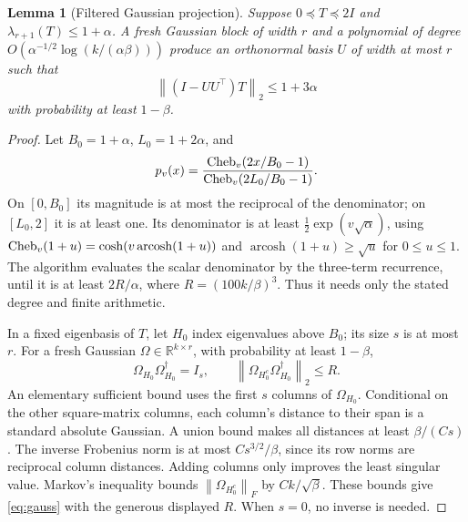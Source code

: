 \documentclass[11pt]{article}
\newtheorem{lemma}[theorem]{Lemma}
\newcommand{\R}{\mathbb R}
\newcommand{\norm}[1]{\left\lVert#1\right\rVert}
\begin{document}
\begin{lemma}[Filtered Gaussian projection]\label{lem:filter}
Suppose \(0\preceq T\preceq2I\) and
\(\lambda_{r+1}(T)\leq1+\alpha\). A fresh Gaussian block of width
\(r\) and a polynomial of degree
\(O(\alpha^{-1/2}\log(k/(\alpha\beta)))\) produce an orthonormal
basis \(U\) of width at most \(r\) such that
\begin{equation}\label{eq:strong}
 \norm{(I-UU^\top)T}_2\leq1+3\alpha
\end{equation}
with probability at least \(1-\beta\).
\end{lemma}
\begin{proof}
Let \(B_0=1+\alpha\), \(L_0=1+2\alpha\), and
\[
 p_v(x)=\frac{{\rm Cheb}_v(2x/B_0-1)}
                  {{\rm Cheb}_v(2L_0/B_0-1)}.
\]
On \([0,B_0]\) its magnitude is at most the reciprocal of the
denominator; on \([L_0,2]\) it is at least one. Its denominator is at
least \(\tfrac12\exp(v\sqrt\alpha)\), using
\({\rm Cheb}_v(1+u)=\cosh(v\operatorname{arcosh}(1+u))\) and
\(\operatorname{arcosh}(1+u)\geq\sqrt u\) for \(0\leq u\leq1\).
The algorithm evaluates the scalar denominator by the three-term recurrence,
until it is at least \(2R/\alpha\), where \(R=(100k/\beta)^3\).
Thus it needs only the stated degree and finite arithmetic.

In a fixed eigenbasis of \(T\), let \(H_0\) index eigenvalues above
\(B_0\); its size \(s\) is at most \(r\). For a fresh Gaussian
\(\Omega\in\R^{k\times r}\), with probability at least \(1-\beta\),
\begin{equation}\label{eq:gauss}
 \Omega_{H_0}\Omega_{H_0}^\dagger=I_s,\qquad
 \norm{\Omega_{H_0^c}\Omega_{H_0}^\dagger}_2\leq R.
\end{equation}
An elementary sufficient bound uses the first \(s\) columns of
\(\Omega_{H_0}\). Conditional on the other square-matrix columns,
each column's distance to their span is a standard absolute Gaussian.
A union bound makes all distances at least \(\beta/(Cs)\).
The inverse Frobenius norm is at most \(Cs^{3/2}/\beta\), since its
row norms are reciprocal column distances. Adding columns only improves
the least singular value. Markov's inequality bounds
\(\norm{\Omega_{H_0^c}}_F\) by \(Ck/\sqrt\beta\).
These bounds give \eqref{eq:gauss} with the generous displayed \(R\).
When \(s=0\), no inverse is needed.


\end{proof}
\end{document}
